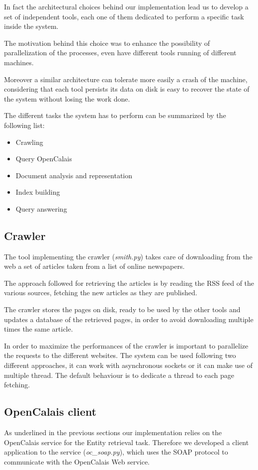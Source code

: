 \documentclass{acm_proc_article-sp-sigmod07}
\begin{document}
In fact the architectural choices behind our implementation lead us to
develop a set of independent tools, each one of them dedicated to perform
a specific task inside the system. 

The motivation behind this choice was to enhance the possibility of
parallelization of the processes, even have different tools running of
different machines.

Moreover a similar architecture can tolerate more easily a crash of the
machine, considering that each tool persists its data on disk is easy to
recover the state of the system without losing the work done.

The different tasks the system has to perform can be summarized by the
following list:
\begin{itemize}
\item Crawling
\item Query OpenCalais
\item Document analysis and representation
\item Index building
\item Query answering
\end{itemize}

\subsection{Crawler}
The tool implementing the crawler (\emph{smith.py}) takes care of
downloading from the web a set of articles taken from a list of online
newspapers.

The approach followed for retrieving the articles is by reading the RSS
feed of the various sources, fetching the new articles as they are
published.

The crawler stores the pages on disk, ready to be used by the other tools
and updates a database of the retrieved pages, in order to avoid
downloading multiple times the same article.

In order to maximize the performances of the crawler is important to
parallelize the requests to the different websites.
The system can be used following two different approaches, it can work
with asynchronous sockets or it can make use of multiple thread. The
default behaviour is to dedicate a thread to each page fetching.

\subsection{OpenCalais client}
As underlined in the previous sections our implementation relies on the
OpenCalais service for the Entity retrieval task. Therefore we developed a
client application to the service (\emph{oc\_soap.py}), which uses the SOAP protocol to
communicate with the OpenCalais Web service. 
\end{document}
